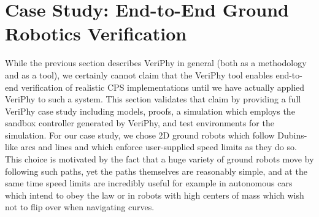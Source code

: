 \documentclass[12pt]{cmuthesis}
\theoremstyle{definition}
\theoremstyle{remark}
\newcommand{\VeriPhy}{VeriPhy\xspace}
\begin{document}
\section{Case Study: End-to-End Ground Robotics Verification}
\label{sec:ground-robotics}
\newcommand{\xgivar}{\textsf{xi}}
\newcommand{\ygivar}{\textsf{yi}}
\newcommand{\xgvar}{\textsf{x}}
\newcommand{\ygvar}{\textsf{y}}
\newcommand{\xcvar}{\textsf{xc}}
\newcommand{\ycvar}{\textsf{yc}}
\newcommand{\ytvar}{\textsf{yt}}
\newcommand{\yvar}{\textsf{y}}
\newcommand{\wvar}{\textsf{w}}
\newcommand{\dxvar}{\textsf{dx}}
\newcommand{\dyvar}{\textsf{dy}}
\newcommand{\dxivar}{\textsf{dxi}}
\newcommand{\dyivar}{\textsf{dyi}}
\newcommand{\dxgvar}{\textsf{dxg}}
\newcommand{\dygvar}{\textsf{dyg}}
\newcommand{\kvar}{\textsf{k}}
\newcommand{\tvar}{\textsf{t}}
\newcommand{\vivar}{\textsf{vi}}
\newcommand{\vlvar}{\textsf{vl}}
\newcommand{\vhvar}{\textsf{vh}}
\newcommand{\ctrl}{\textsf{ctrl}\xspace}
\newcommand{\ctrlliv}{\ctrl_{\text{a}}}
\newcommand{\plant}{\textsf{plant}\xspace}
\newcommand{\psimp}{\ensuremath{\alpha_{SV}}\xspace}
\newcommand{\exctrl}{\textsf{ctrl}_{SV}\xspace}
\newcommand{\pdrive}{\textsf{go}\xspace}
\newcommand{\pstop}{\textsf{stop}\xspace}
\newcommand{\explant}{\textsf{plant}_{SV}\xspace}
\newcommand{\lnorm}[1]{{{\norm{#1}}_{\infty}}}
\newcommand{\enorm}[1]{\norm{#1}}
\newcommand{\linv}{J}

While the previous section describes \VeriPhy in general (both as a methodology and as a tool), we certainly cannot claim that the \VeriPhy tool enables end-to-end verification of realistic CPS implementations until we have actually applied \VeriPhy to such a system.
This section validates that claim by providing a full \VeriPhy case study including \dL models, proofs, a simulation which employs the sandbox controller generated by \VeriPhy, and test environments for the simulation.
For our case study, we chose 2D ground robots which follow Dubins-like arcs and lines and which enforce user-supplied speed limits as they do so.
This choice is motivated by the fact that a huge variety of ground robots move by following such paths, yet the paths themselves are reasonably simple, and at the same time speed limits are incredibly useful for example in autonomous cars which intend to obey the law or in robots with high centers of mass which wish not to flip over when navigating curves.
\end{document}
